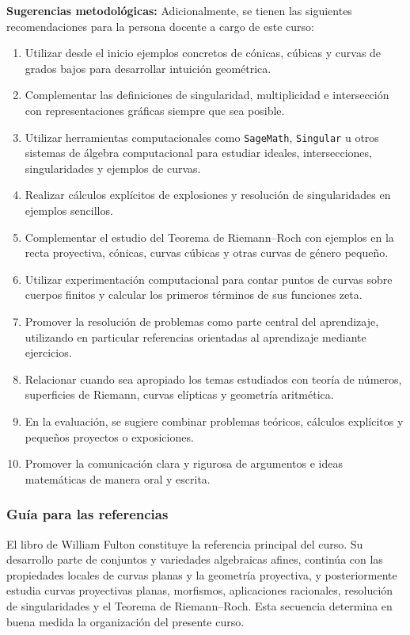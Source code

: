 \begin{refsection}
\textbf{Sugerencias metodológicas:} Adicionalmente, se tienen las siguientes recomendaciones para la persona docente a cargo de este curso:
\begin{enumerate}
\item Utilizar desde el inicio ejemplos concretos de cónicas, cúbicas y curvas de grados bajos para desarrollar intuición geométrica.
\item Complementar las definiciones de singularidad, multiplicidad e intersección con representaciones gráficas siempre que sea posible.
\item Utilizar herramientas computacionales como \texttt{SageMath}, \texttt{Singular} u otros sistemas de álgebra computacional para estudiar ideales, intersecciones, singularidades y ejemplos de curvas.
\item Realizar cálculos explícitos de explosiones y resolución de singularidades en ejemplos sencillos.
\item Complementar el estudio del Teorema de Riemann--Roch con ejemplos en la recta proyectiva, cónicas, curvas cúbicas y otras curvas de género pequeño.
\item Utilizar experimentación computacional para contar puntos de curvas sobre cuerpos finitos y calcular los primeros términos de sus funciones zeta.
\item Promover la resolución de problemas como parte central del aprendizaje, utilizando en particular referencias orientadas al aprendizaje mediante ejercicios.
\item Relacionar cuando sea apropiado los temas estudiados con teoría de números, superficies de Riemann, curvas elípticas y geometría aritmética.
\item En la evaluación, se sugiere combinar problemas teóricos, cálculos explícitos y pequeños proyectos o exposiciones.
\item Promover la comunicación clara y rigurosa de argumentos e ideas matemáticas de manera oral y escrita.
\end{enumerate}

\subsubsection*{Guía para las referencias}

El libro de William Fulton \cite{Ful89} constituye la referencia principal del curso. Su desarrollo parte de conjuntos y variedades algebraicas afines, continúa con las propiedades locales de curvas planas y la geometría proyectiva, y posteriormente estudia curvas proyectivas planas, morfismos, aplicaciones racionales, resolución de singularidades y el Teorema de Riemann--Roch. Esta secuencia determina en buena medida la organización del presente curso.


\end{refsection}
